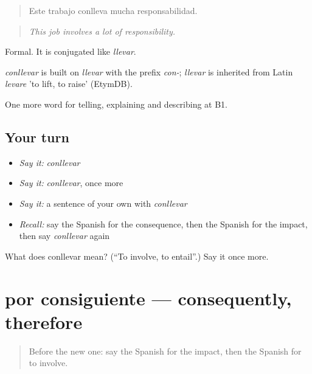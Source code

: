 \begin{quote}
Este trabajo conlleva mucha responsabilidad.
\end{quote}

\begin{quote}
\emph{This job involves a lot of responsibility.}
\end{quote}

Formal. It is conjugated like \emph{llevar}.

\begin{cousinweb}
\emph{conllevar} is built on \emph{llevar} with the prefix \emph{con-}; \emph{llevar} is inherited from Latin \emph{levare} 'to lift, to raise' (EtymDB).
\end{cousinweb}

\begin{grammarlens}[title={What you've built}]
One more word for telling, explaining and describing at B1.
\end{grammarlens}

\subsection*{Your turn}
\begin{itemize}
\raggedright
  \item \emph{Say it:} \emph{conllevar}
  \item \emph{Say it:} \emph{conllevar}, once more
  \item \emph{Say it:} a sentence of your own with \emph{conllevar}
  \item \emph{Recall:} say the Spanish for the consequence, then the Spanish for the impact, then say \emph{conllevar} again
\end{itemize}

\begin{tcolorbox}[breakable,colback=teal!4,colframe=teal!35!black,title={Before you move on}]
What does conllevar mean? (\textquotedblleft{}To involve, to entail\textquotedblright{}.) Say it once more.
\end{tcolorbox}
\section[por consiguiente]{por consiguiente — consequently, therefore}

\label{lesson:ES-C582-por-consiguiente}



\begin{quote}
Before the new one: say the Spanish for the impact, then the Spanish for to involve.
\end{quote}

